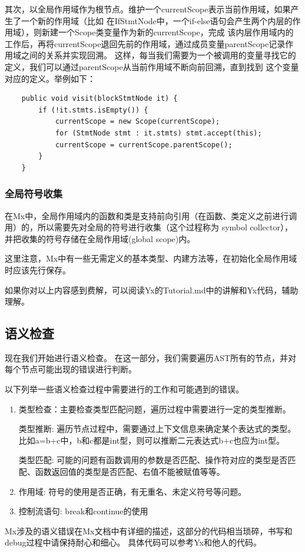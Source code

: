 其次，以全局作用域作为根节点。维护一个currentScope表示当前作用域，如果产生了一个新的作用域（比如
在IfStmtNode中，一个if-else语句会产生两个内层的作用域），则新建一个Scope类变量作为新的currentScope，完成
该内层作用域内的工作后，再将currentScope退回先前的作用域，通过成员变量parentScope记录作用域之间的关系并实现回溯。
这样，每当我们需要为一个被调用的变量寻找它的定义，我们可以通过parentScope从当前作用域不断向前回溯，直到找到
这个变量对应的定义。举例如下：
\begin{lstlisting}
    public void visit(blockStmtNode it) {
        if (!it.stmts.isEmpty()) {
            currentScope = new Scope(currentScope);
            for (StmtNode stmt : it.stmts) stmt.accept(this);
            currentScope = currentScope.parentScope();
        }
    }
\end{lstlisting}

\subsubsection{全局符号收集}
在Mx中，全局作用域内的函数和类是支持前向引用（在函数、类定义之前进行调用）的，所以需要先对全局的符号进行收集（这个过程称为 symbol collector），
并把收集的符号存储在全局作用域(global scope)内。

这里注意，Mx中有一些无需定义的基本类型、内建方法等，在初始化全局作用域时应该先行保存。

如果你对以上内容感到费解，可以阅读Yx的Tutorial.md中的讲解和Yx代码，辅助理解。

\subsection{语义检查}
现在我们开始进行语义检查。
在这一部分，我们需要遍历AST所有的节点，并对每个节点可能出现的错误进行判断。

以下列举一些语义检查过程中需要进行的工作和可能遇到的错误。

\begin{enumerate}
    \item 类型检查：主要检查类型匹配问题，遍历过程中需要进行一定的类型推断。
    
    类型推断: 遍历节点过程中，需要通过上下文信息来确定某个表达式的类型。
    比如a=b+c中，b和c都是int型，则可以推断二元表达式b+c也应为int型。

    类型匹配: 可能的问题有函数调用的参数是否匹配、操作符对应的类型是否匹配、函数返回值的类型是否匹配、右值不能被赋值等等。
    \item 作用域: 符号的使用是否正确，有无重名、未定义符号等问题。
    \item 控制流语句: break和continue的使用
\end{enumerate}


Mx涉及的语义错误在Mx文档中有详细的描述，这部分的代码相当琐碎，书写和debug过程中请保持耐心和细心。
具体代码可以参考Yx和他人的代码。
